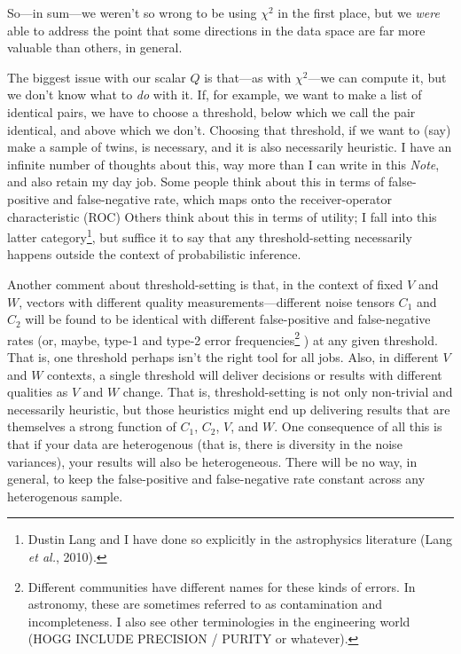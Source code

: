 \documentclass[12pt,letterpaper]{article}
\newcommand{\foreign}[1]{\textsl{#1}}
\newcommand{\acronym}[1]{{\small{#1}}}
\newcommand{\documentname}{\textsl{Note}}
\newcommand{\etal}{\foreign{et al.}}
\begin{document}
So---in sum---we weren't so wrong to be using $\chi^2$ in the first
place, but we \emph{were} able to address the point that some directions
in the data space are far more valuable than others, in general.

The biggest issue with our scalar $Q$ is that---as with $\chi^2$---we
can compute it, but we don't know what to \emph{do} with it. If, for
example, we want to make a list of identical pairs, we have to choose
a threshold, below which we call the pair identical, and above which
we don't. Choosing that threshold, if we want to (say) make a sample
of twins, is necessary, and it is also necessarily heuristic. I have
an infinite number of thoughts about this, way more than I can write
in this \documentname, and also retain my day job. Some people think about
this in terms of false-positive and false-negative rate, which maps
onto the receiver-operator characteristic (\acronym{ROC}) Others think
about this in terms of utility; I fall into this latter
category\footnote{Dustin Lang and I have done so explicitly in the
  astrophysics literature (Lang \etal, 2010).},
but suffice it to say that any threshold-setting necessarily happens
outside the context of probabilistic inference.

Another comment about threshold-setting is that, in the context of
fixed $V$ and $W$, vectors with different quality
measurements---different noise tensors $C_1$ and $C_2$ will be found
to be identical with different false-positive and false-negative rates
(or, maybe, type-1 and type-2 error frequencies\footnote{%
  Different communities have different names for these kinds of errors.
  In astronomy, these are sometimes referred to as contamination and
  incompleteness. I also see other terminologies in the engineering
  world (HOGG INCLUDE PRECISION / PURITY or whatever).}
) at any given
threshold. That is, one threshold perhaps isn't the right tool for all
jobs. Also, in different $V$ and $W$ contexts, a single threshold will
deliver decisions or results with different qualities as $V$ and $W$
change. That is, threshold-setting is not only non-trivial and
necessarily heuristic, but those heuristics might end up delivering
results that are themselves a strong function of $C_1$, $C_2$, $V$,
and $W$. One consequence of all this is that if your data are
heterogenous (that is, there is diversity in the noise variances),
your results will also be heterogeneous. There will be no way, in
general, to keep the false-positive and false-negative rate constant
across any heterogenous sample.
\end{document}
